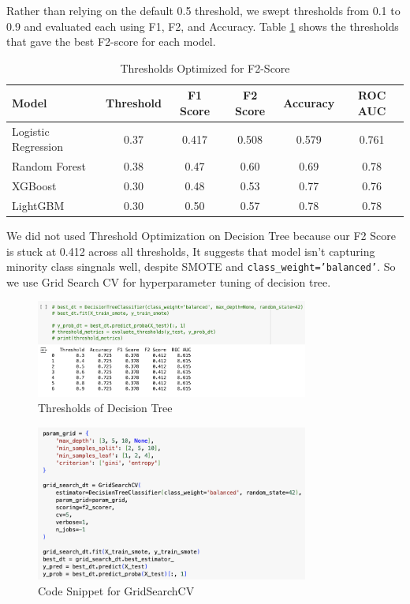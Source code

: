\documentclass[12pt,a4paper]{article}
\begin{document}
Rather than relying on the default 0.5 threshold, we swept thresholds from 0.1 to 0.9 and evaluated
each using F1, F2, and Accuracy. Table \ref{tab:thresholds_f2} shows the thresholds that gave the best F2-score for each
model.

\begin{table}[H]
\centering
\caption{Thresholds Optimized for F2-Score}
\label{tab:thresholds_f2}
\begin{tabular}{lccccc}
\toprule
Model & Threshold & F1 Score & F2 Score & Accuracy & ROC AUC \\
\midrule
Logistic Regression & 0.37 & 0.417 & 0.508 & 0.579 & 0.761 \\
Random Forest & 0.38 & 0.47 & 0.60 & 0.69 & 0.78 \\
XGBoost & 0.30 & 0.48 & 0.53 & 0.77 & 0.76 \\
LightGBM & 0.30 & 0.50 & 0.57 & 0.78 & 0.78 \\
\bottomrule
\end{tabular}
\end{table}

We did not used Threshold Optimization on Decision Tree because our F2 Score is stuck at 0.412
across all thresholds, It suggests that model isn't capturing minority class singnals well, despite
SMOTE and \texttt{class\_weight='balanced'}.
So we use Grid Search CV for hyperparameter tuning of decision tree.

\begin{figure}[H]
    \centering
    \includegraphics[width=0.8\textwidth]{figures/15.png}
    \caption{Thresholds of Decision Tree}
\end{figure}

\begin{figure}[H]
    \centering
    \includegraphics[width=0.8\textwidth]{figures/16.png}
    \caption{Code Snippet for GridSearchCV}
\end{figure}
\end{document}
